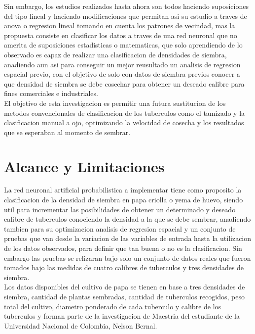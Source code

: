 Sin embargo, los estudios realizados hasta ahora son todos haciendo suposiciones del tipo lineal y haciendo modificaciones que permitan asi su estudio a traves de anova o regresion lineal tomando en cuenta los patrones de vecindad, mas la propuesta consiste en clasificar los datos a traves de una red neuronal que no amerita de suposiciones estadisticas o matematicas, que solo aprendiendo de lo observado es capaz de realizar una clasificacion de densidades de siembra, anadiendo aun asi para conseguir un mejor reusultado un analisis de regresion espacial previo, con el objetivo de solo con datos de siembra previos conocer a que densidad de siembra se debe cosechar para obtener un deseado calibre para fines comerciales e industriales.\\

El objetivo de esta investigacion es permitir una futura sustitucion de los metodos convencionales de clasificacion de los tuberculos como el tamizado y la clasificacion manual a ojo, optimizando la velocidad de cosecha y los resultados que se esperaban al momento de sembrar.

\section{Alcance y Limitaciones}

La red neuronal artificial probabilistica a implementar tiene como proposito la clasificacion de la densidad de siembra en papa criolla o yema de huevo, siendo util para incrementar las posibilidades de obtener un determinado y deseado calibre de tuberculos conociendo la densidad a la que se debe sembrar, anadiendo tambien para su optimizacion analisis de regresion espacial y un conjunto de pruebas que van desde la variacion de las variables de entrada hasta la utilizacion de los datos observados, para definir que tan buena o no es la clasificacion. Sin embargo las pruebas se relizaran bajo solo un conjunto de datos reales que fueron tomados bajo las medidas de cuatro calibres de tuberculos y tres densidades de siembra. \\

Los datos disponibles del cultivo de papa se tienen en base a tres densidades de siembra, cantidad de plantas sembradas, cantidad de tuberculos recogidos, peso total del cultivo, diametro ponderado de cada tuberculo y calibre de los tuberculos y forman parte de la investigacion de Maestria del estudiante de la Universidad Nacional de Colombia, Nelson Bernal.\\

